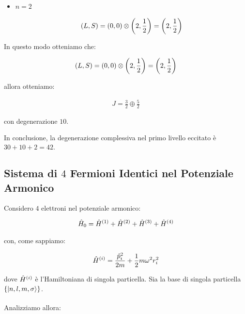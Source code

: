 \begin{itemize}
\begin{enumerate}
\begin{itemize}
				Per antisimmetria vale che:
				
			\begin{align*}
				\qty(L, S)_{12} = \qty(0, 0)
			\end{align*}

			\item $n = 2$
			
			\begin{align*}
				\qty(L, S) = \qty(0, 0) \otimes \qty(2, \frac{1}{2}) = \qty(2, \frac{1}{2})
			\end{align*}
				
		\end{itemize}
		
			In questo modo otteniamo che:
			
		\begin{align*}
			\qty(L, S) = \qty(0, 0) \otimes \qty(2, \frac{1}{2}) = \qty(2, \frac{1}{2})
		\end{align*}
		
			allora otteniamo:
				
		\begin{align*}
			J = \frac{3}{2} \oplus \frac{5}{2}
		\end{align*}
			
			con degenerazione $10$.

	\end{enumerate}

		In conclusione, la degenerazione complessiva nel primo livello eccitato è $30 + 10 + 2 = 42.$ 
	
\end{itemize}

\subsection{Sistema di $4$ Fermioni Identici nel Potenziale Armonico}
	
	Considero $4$ elettroni nel potenziale armonico:
	
\begin{align*}	
	\hat{H}_0 = \hat{H}^{\qty(1)} + \hat{H}^{\qty(2)} + \hat{H}^{\qty(3)} + \hat{H}^{\qty(4)}
\end{align*}

	con, come sappiamo:
	
\begin{align*}
	\hat{H}^{\qty(i)} = \frac{\hat{p}^2_i}{2m} + \frac{1}{2} m \omega^2 r^2_i
\end{align*}

	dove $\hat{H}^{\qty(i)}$ è l'Hamiltoniana di singola particella. Sia la base di singola particella $\qty{\ket{n, l, m, \sigma}}$.
	\\
	\\
	Analizziamo allora:
	
